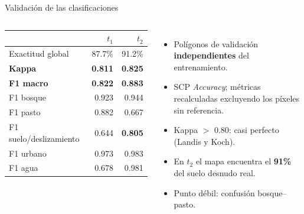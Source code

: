 \documentclass[aspectratio=169,11pt]{beamer}
\begin{document}
\begin{frame}{Validación de las clasificaciones}
\begin{columns}[T]
\small
\begin{tabular}{lrr}
\toprule
& $t_1$ & $t_2$ \\
\midrule
Exactitud global & 87.7\% & 91.2\% \\
\textbf{Kappa} & \textbf{0.811} & \textbf{0.825} \\
\textbf{F1 macro} & \textbf{0.822} & \textbf{0.883} \\
\midrule
F1 bosque & 0.923 & 0.944 \\
F1 pasto & 0.882 & 0.667 \\
F1 \alert{suelo/deslizamiento} & 0.644 & \alert{\textbf{0.805}} \\
F1 urbano & 0.973 & 0.983 \\
F1 agua & 0.678 & 0.981 \\
\bottomrule
\end{tabular}
\small
\begin{itemize}
  \item Polígonos de validación \textbf{independientes} del entrenamiento.
  \item SCP \emph{Accuracy}; métricas recalculadas excluyendo los píxeles sin referencia.
  \item Kappa $>$ 0.80: casi perfecto (Landis y Koch).
  \item En $t_2$ el mapa encuentra el \textbf{91\%} del suelo desnudo real.
  \item Punto débil: confusión bosque--pasto.
\end{itemize}
\end{columns}
\end{frame}
\end{document}
